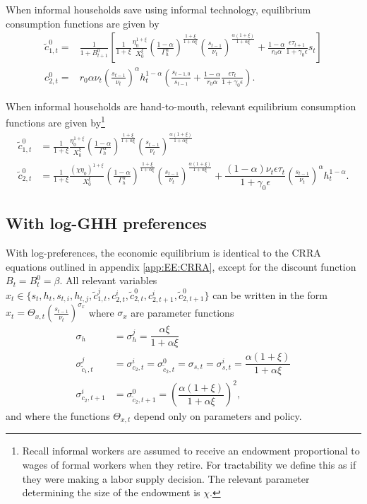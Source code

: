 When informal households save using informal technology, equilibrium consumption functions are given by
\begin{align}
    \tilde{c}_{1,t}^0 =& \frac{1}{1+B_{t+1}^0}\left[\frac{1}{1+\xi}\frac{\eta_{0}^{1+\xi}}{X_{0}^{\xi}}\left(\frac{1-\alpha}{\Gamma_{h}^{\alpha}}\right)^{\frac{1+\xi}{1+\alpha\xi}}\left(\frac{s_{t-1}}{\nu_t}\right)^{\frac{\alpha(1+\xi)}{1+\alpha\xi}}+\frac{1-\alpha}{r_0 \alpha}\frac{\epsilon\tau_{t+1}}{1+\gamma_0\epsilon} s_t\right] \\
    c_{2,t}^0 =& r_0\alpha \nu_t\left(\frac{s_{t-1}}{\nu_t}\right)^{\alpha}h_t^{1-\alpha}\left(\frac{s_{t-1,0}}{s_{t-1}}+\frac{1-\alpha}{r_0\alpha} \frac{\epsilon\tau_t}{1+\gamma_0\epsilon }\right).
\end{align}


When informal households are hand-to-mouth, relevant equilibrium consumption functions are given by\footnote{Recall informal workers are assumed to receive an endowment proportional to wages of formal workers when they retire. For tractability we define this as if they were making a labor supply decision. The relevant parameter determining the size of the endowment is $\chi$.}
\begin{align}
    \tilde{c}_{1,t}^0 &= \frac{1}{1+\xi}\frac{\eta_{0}^{1+\xi}}{X_{0}^{\xi}}\left(\frac{1-\alpha}{\Gamma_{h}^{\alpha}}\right)^{\frac{1+\xi}{1+\alpha\xi}}\left(\frac{s_{t-1}}{\nu_t}\right)^{\frac{\alpha(1+\xi)}{1+\alpha\xi}} \\
    \tilde{c}_{2,t}^0 &= \frac{1}{1+\xi}\frac{(\chi \eta_{0})^{1+\xi}}{X_{0}^{\xi}}\left(\frac{1-\alpha}{\Gamma_{h}^{\alpha}}\right)^{\frac{1+\xi}{1+\alpha\xi}}\left(\frac{s_{t-1}}{\nu_t}\right)^{\frac{\alpha(1+\xi)}{1+\alpha\xi}}+\dfrac{(1-\alpha)\nu_t\epsilon \tau_t}{1+\gamma_0\epsilon}\left(\frac{s_{t-1}}{\nu_t}\right)^\alpha h_t^{1-\alpha}.
\end{align}



\subsection{With log-GHH preferences}\label{app:EE:LOG}
With log-preferences, the economic equilibrium is identical to the CRRA equations outlined in appendix \ref{app:EE:CRRA}, except for the discount function $B_t =B^0_t= \beta$. All relevant variables $x_t\in \lbrace s_t, h_t, s_{t,i}, h_{t,j}, \tilde{c}_{1,t}^j, c_{2,t}^i, \tilde{c}_{2,t}^0, c_{2,t+1}^i, \tilde{c}_{2,t+1}^0\rbrace$ can be written in the form $x_t = \Theta_{x,t}\left(\frac{s_{t-1}}{\nu_t}\right)^{\sigma_x}$ where $\sigma_x$ are parameter functions
\begin{align*}
    \sigma_{h} &= \sigma_{h}^j = \dfrac{\alpha \xi}{1+\alpha \xi} \\ 
    \sigma_{\tilde{c}_1,t}^j &= \sigma_{c_2,t}^i = \sigma_{\tilde{c}_2,t}^0 = \sigma_{s,t} = \sigma_{s,t}^i =\dfrac{\alpha(1+\xi)}{1+\alpha\xi} \\
    \sigma_{c_2,t+1}^i &= \sigma_{\tilde{c}_2,t+1}^0 = \left(\dfrac{\alpha(1+\xi)}{1+\alpha\xi}\right)^2,
\end{align*}
and where the functions $\Theta_{x,t}$ depend only on parameters and policy.

